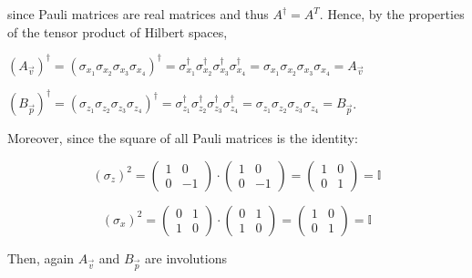 \documentclass{Configuration_Files/PoliMi3i_thesis}
\begin{document}
since Pauli matrices are real matrices and thus $A^{\dagger}=A^T$.
Hence, by the properties of the tensor product of Hilbert spaces,

\begin{center}
	$(A_{\vec{v}})^{\dagger} = (\sigma_{x_1} \sigma_{x_2} \sigma_{x_3} \sigma_{x_4})^{\dagger} = \sigma_{x_1}^{\dagger} \sigma_{x_2}^{\dagger} \sigma_{x_3}^{\dagger} \sigma_{x_4}^{\dagger} = \sigma_{x_1} \sigma_{x_2} \sigma_{x_3} \sigma_{x_4} = A_{\vec{v}}$ \newline
	
	$(B_{\vec{p}})^{\dagger} = (\sigma_{z_1} \sigma_{z_2} \sigma_{z_3} \sigma_{z_4})^{\dagger} = \sigma_{z_1}^{\dagger} \sigma_{z_2}^{\dagger} \sigma_{z_3}^{\dagger} \sigma_{z_4}^{\dagger} = \sigma_{z_1} \sigma_{z_2} \sigma_{z_3} \sigma_{z_4} = B_{\vec{p}}$. \newline
\end{center}

Moreover, since the square of all Pauli matrices is the identity:\newline

\[
\text{$( \sigma_z )^{2}$} = 
\begin{pmatrix}
	1 & 0 \\
	0 & -1
\end{pmatrix} \cdot
\begin{pmatrix}
	1 & 0 \\
	0 & -1
\end{pmatrix} =
\begin{pmatrix}
	1 & 0 \\
	0 & 1
\end{pmatrix}
= \text{$\mathbb{I}$}
\]


\[
\text{$( \sigma_x )^{2}$} = 
\begin{pmatrix}
	0 & 1 \\
	1 & 0
\end{pmatrix} \cdot
\begin{pmatrix}
	0 & 1 \\
	1 & 0
\end{pmatrix} =
\begin{pmatrix}
	1 & 0 \\
	0 & 1
\end{pmatrix}
= \text{$\mathbb{I}$}
\]\newline


Then, again $A_{\vec{v}}$ and $B_{\vec{p}}$ are involutions \newline
\end{document}

